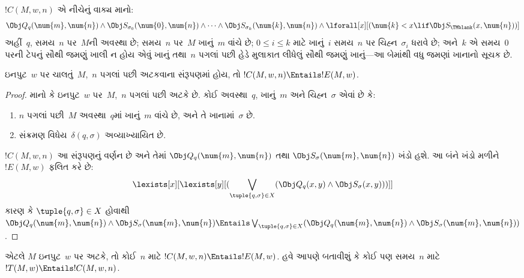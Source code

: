 \begin{defn}
$!C(M, w, n)$ એ નીચેનું વાક્ય માનો:
\[
\Obj Q_q(\num{m}, \num{n}) \land \Obj S_{\sigma_0}(\num{0}, \num{n})
\land \dots \land \Obj S_{\sigma_k}(\num{k}, \num{n}) \land
\lforall[x][(\num{k} < x \lif \Obj S_\TMblank(x, \num{n}))]
\]
અહીં~$q$, સમય~$n$ પર~$M$ની અવસ્થા છે;
સમય~$n$ પર~$M$ ખાનું~$m$ વાંચે છે;
$0 \le i \le k$ માટે ખાનું~$i$ સમય~$n$ પર
ચિહ્ન~$\sigma_i$ ધરાવે છે;
અને~$k$ એ સમય~$0$ પરની ટેપનું સૌથી જમણું ખાલી
ન હોય એવું ખાનું તથા~$n$ પગલાં પછી હેડે મુલાકાત
લીધેલું સૌથી જમણું ખાનું—આ બેમાંથી વધુ જમણાં
ખાનાનો સૂચક છે.
\end{defn}

\begin{lem}
ઇનપુટ~$w$ પર ચાલતું~$M$,~$n$ પગલાં પછી
અટકવાના સંરૂપણમાં હોય, તો
$!C(M, w, n) \Entails !E(M, w)$.
\end{lem}

\begin{proof}
માનો કે ઇનપુટ~$w$ પર~$M$,~$n$ પગલાં પછી અટકે છે.
કોઈ અવસ્થા~$q$, ખાનું~$m$ અને ચિહ્ન~$\sigma$
એવાં છે કે:
\begin{enumerate}
\item $n$ પગલાં પછી~$M$ અવસ્થા~$q$માં ખાનું~$m$
  વાંચે છે, અને તે ખાનામાં~$\sigma$ છે.
\item સંક્રમણ વિધેય~$\delta(q, \sigma)$ અવ્યાખ્યાયિત છે.
\end{enumerate}
$!C(M, w, n)$ આ સંરૂપણનું વર્ણન છે અને તેમાં
$\Obj Q_{q}(\num{m}, \num{n})$ તથા
$\Obj S_{\sigma}(\num{m}, \num{n})$ ખંડો હશે.
આ બંને ખંડો મળીને~$!E(M, w)$ ફલિત કરે છે:
\[
\lexists[x][\lexists[y][(\bigvee_{\tuple{q, \sigma} \in
      X}(\Obj Q_q(x, y) \land \Obj S_\sigma(x, y)))]]
\]
કારણ કે $\tuple{q,\sigma} \in X$ હોવાથી
$\Obj Q_q(\num{m}, \num{n}) \land
\Obj S_{\sigma}(\num{m}, \num{n}) \Entails
\bigvee_{\tuple{q, \sigma} \in X}
(\Obj Q_q(\num{m}, \num{n}) \land
\Obj S_{\sigma}(\num{m}, \num{n}))$.
\end{proof}

\begin{explain}
એટલે $M$ ઇનપુટ~$w$ પર અટકે, તો કોઈ~$n$ માટે
$!C(M, w, n) \Entails !E(M,w)$. હવે આપણે
બતાવીશું કે કોઈ પણ સમય~$n$ માટે
$!T(M, w) \Entails !C(M, w, n)$.
\end{explain}

